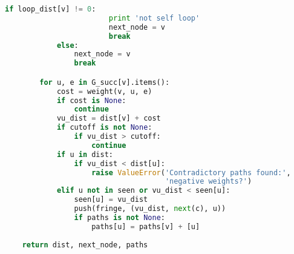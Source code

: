 \begin{lstlisting}[language=Python]
                    if loop_dist[v] != 0:
                        print 'not self loop'
                        next_node = v
                        break 
            else:
                next_node = v
                break

        for u, e in G_succ[v].items():
            cost = weight(v, u, e)
            if cost is None:
                continue
            vu_dist = dist[v] + cost
            if cutoff is not None:
                if vu_dist > cutoff:
                    continue
            if u in dist:
                if vu_dist < dist[u]:
                    raise ValueError('Contradictory paths found:',
                                     'negative weights?')
            elif u not in seen or vu_dist < seen[u]:
                seen[u] = vu_dist
                push(fringe, (vu_dist, next(c), u))
                if paths is not None:
                    paths[u] = paths[v] + [u]
    
    return dist, next_node, paths
\end{lstlisting}


